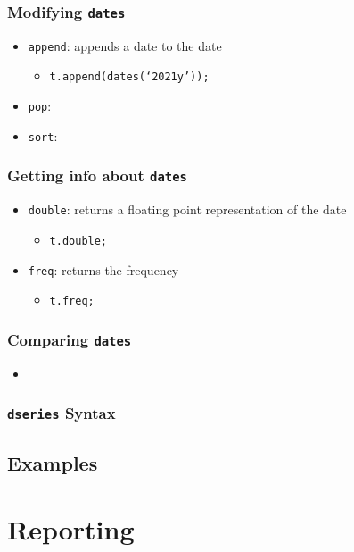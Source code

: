 \documentclass[10pt]{beamer}
\begin{document}
\begin{frame}[fragile,t]
  \frametitle{Modifying \texttt{dates}}
  \begin{itemize}
  \item \texttt{append}: appends a date to the date
    \begin{itemize}
    \item \texttt{t.append(dates(`2021y'));}
    \end{itemize}
  \item \texttt{pop}:
  \item \texttt{sort}:
  \end{itemize}
\end{frame}


\begin{frame}[fragile,t]
  \frametitle{Getting info about \texttt{dates}}
  \begin{itemize}
  \item \texttt{double}: returns a floating point representation of the date
    \begin{itemize}
    \item \texttt{t.double;}
    \end{itemize}
  \item \texttt{freq}: returns the frequency
    \begin{itemize}
    \item \texttt{t.freq;}
    \end{itemize}
  \end{itemize}
\end{frame}


\begin{frame}[fragile,t]
  \frametitle{Comparing \texttt{dates}}
  \begin{itemize}
  \item 
  \end{itemize}
\end{frame}

\subsubsection{\texttt{dseries} Syntax}


\subsection{Examples}


%
%
\section{Reporting}
\end{document}
